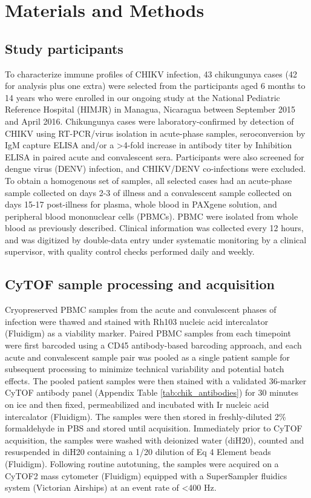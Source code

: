 \section{Materials and Methods}

\subsection{Study participants}

To characterize immune profiles of CHIKV infection, 43 chikungunya cases (42 for analysis plus one extra) were selected from the participants aged 6 months to 14 years who were enrolled in our ongoing study at the National Pediatric Reference Hospital (HIMJR) in Managua, Nicaragua between September 2015 and April 2016. Chikungunya cases were laboratory-confirmed by detection of CHIKV using RT-PCR/virus isolation in acute-phase samples, seroconversion by IgM capture ELISA and/or a >4-fold increase in antibody titer by Inhibition ELISA in paired acute and convalescent sera.\autocite{Balmaseda2006,Hammond2005} Participants were also screened for dengue virus (DENV) infection, and CHIKV/DENV co-infections were excluded. To obtain a homogenous set of samples, all selected cases had an acute-phase sample collected on days 2-3 of illness and a convalescent sample collected on days 15-17 post-illness for plasma, whole blood in PAXgene solution, and peripheral blood mononuclear cells (PBMCs). PBMC were isolated from whole blood as previously described.\autocite{Durbin2008} Clinical information was collected every 12 hours, and was digitized by double-data entry under systematic monitoring by a clinical supervisor, with quality control checks performed daily and weekly. 

\subsection{CyTOF sample processing and acquisition}

Cryopreserved PBMC samples from the acute and convalescent phases of infection were thawed and stained with Rh103 nucleic acid intercalator (Fluidigm) as a viability marker. Paired PBMC samples from each timepoint were first barcoded using a CD45 antibody-based barcoding approach,\autocite{Mei2016} and each acute and convalescent sample pair was pooled as a single patient sample for subsequent processing to minimize technical variability and potential batch effects. The pooled patient samples were then stained with a validated 36-marker CyTOF antibody panel (Appendix Table \ref{tab:chik_antibodies}) for 30 minutes on ice and then fixed, permeabilized and incubated with Ir nucleic acid intercalator (Fluidigm). The samples were then stored in freshly-diluted 2\% formaldehyde in PBS and stored until acquisition. Immediately prior to CyTOF acquisition, the samples were washed with deionized water (diH20), counted and resuspended in diH20 containing a 1/20 dilution of Eq 4 Element beads (Fluidigm). Following routine autotuning, the samples were acquired on a CyTOF2 mass cytometer (Fluidigm) equipped with a SuperSampler fluidics system (Victorian Airships) at an event rate of <400 Hz. 

